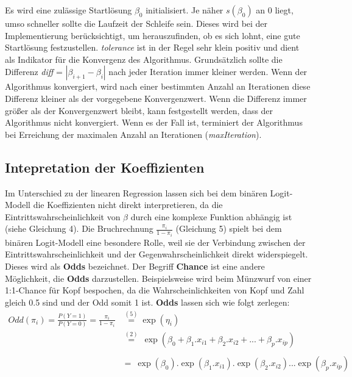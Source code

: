\documentclass[12pt,]{article}
\begin{document}
Es wird eine zulässige Startlösung \(\beta_0\) initialisiert. Je näher
\(s(\beta_0)\) an 0 liegt, umso schneller sollte die Laufzeit der
Schleife sein. Dieses wird bei der Implementierung berücksichtigt, um
herauszufinden, ob es sich lohnt, eine gute Startlösung festzustellen.
\emph{tolerance} ist in der Regel sehr klein positiv und dient als
Indikator für die Konvergenz des Algorithmus. Grundsätzlich sollte die
Differenz \emph{diff} = \(|\beta_{i+1} - \beta_i|\) nach jeder Iteration
immer kleiner werden. Wenn der Algorithmus konvergiert, wird nach einer
bestimmten Anzahl an Iterationen diese Differenz kleiner als der
vorgegebene Konvergenzwert. Wenn die Differenz immer größer als der
Konvergenzwert bleibt, kann festgestellt werden, dass der Algorithmus
nicht konvergiert. Wenn es der Fall ist, terminiert der Algorithmus bei
Erreichung der maximalen Anzahl an Iterationen (\emph{maxIteration}).

\subsection{Intepretation der
Koeffizienten}\label{intepretation-der-koeffizienten}

Im Unterschied zu der linearen Regression lassen sich bei dem binären
Logit-Modell die Koeffizienten nicht direkt interpretieren, da die
Eintrittswahrscheinlichkeit von \(\beta\) durch eine komplexe Funktion
abhängig ist (siehe Gleichung 4). Die Bruchrechnung
\(\frac{\pi_i}{1-\pi_i}\) (Gleichung 5) spielt bei dem binären
Logit-Modell eine besondere Rolle, weil sie der Verbindung zwischen der
Eintrittswahrscheinlichkeit und der Gegenwahrscheinlichkeit direkt
widerspiegelt. Dieses wird als \textbf{Odds} bezeichnet. Der Begriff
\textbf{Chance} ist eine andere Möglichkeit, die \textbf{Odds}
darzustellen. Beispielsweise wird beim Münzwurf von einer 1:1-Chance für
Kopf bespochen, da die Wahrscheinlichkeiten von Kopf und Zahl gleich 0.5
sind und der Odd somit 1 ist. \textbf{Odds} lassen sich wie folgt
zerlegen: \[
\begin{aligned}
Odd(\pi_i) = \frac{P(Y = 1)}{P(Y=0)} = \frac{\pi_i}{1-\pi_i} &\mathrel{\overset{(5)}{=}} \exp(\eta_i) \\ &\mathrel{\overset{(2)}{=}} \  \exp(\beta_0 + \beta_1.x_{i1} + \beta_2.x_{i2} + ... + \beta_p.x_{ip}) \\ \\
&= \ \exp(\beta_0).\exp(\beta_1.x_{i1}).\exp(\beta_2.x_{i2}) ... \exp(\beta_p.x_{ip})
\end{aligned}
\]
\end{document}
